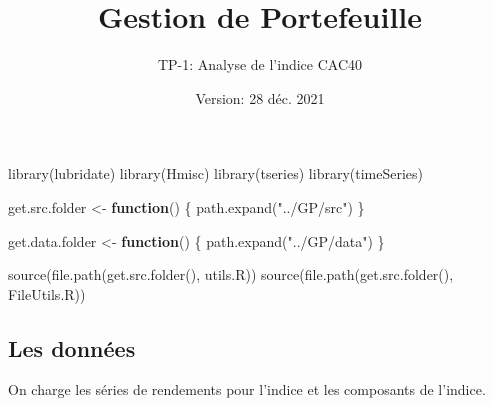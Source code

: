 \documentclass[
]{article}
\title{Gestion de Portefeuille}
\subtitle{TP-1: Analyse de l'indice CAC40}
\author{}
\date{\vspace{-2.5em}Version: 28 déc. 2021}
\newenvironment{Shaded}{\begin{snugshade}}{\end{snugshade}}
\newcommand{\ControlFlowTok}[1]{\textcolor[rgb]{0.13,0.29,0.53}{\textbf{#1}}}
\newcommand{\FunctionTok}[1]{\textcolor[rgb]{0.00,0.00,0.00}{#1}}
\newcommand{\NormalTok}[1]{#1}
\newcommand{\OtherTok}[1]{\textcolor[rgb]{0.56,0.35,0.01}{#1}}
\newcommand{\StringTok}[1]{\textcolor[rgb]{0.31,0.60,0.02}{#1}}
\begin{document}
\maketitle

\begin{Shaded}
\begin{Highlighting}[]
\FunctionTok{library}\NormalTok{(lubridate)}
\FunctionTok{library}\NormalTok{(Hmisc)}
\FunctionTok{library}\NormalTok{(tseries)}
\FunctionTok{library}\NormalTok{(timeSeries)}

\NormalTok{get.src.folder }\OtherTok{\textless{}{-}} \ControlFlowTok{function}\NormalTok{() \{}
  \FunctionTok{path.expand}\NormalTok{(}\StringTok{"../GP/src"}\NormalTok{)}
\NormalTok{\}}

\NormalTok{get.data.folder }\OtherTok{\textless{}{-}} \ControlFlowTok{function}\NormalTok{() \{}
  \FunctionTok{path.expand}\NormalTok{(}\StringTok{"../GP/data"}\NormalTok{)}
\NormalTok{\}}

\FunctionTok{source}\NormalTok{(}\FunctionTok{file.path}\NormalTok{(}\FunctionTok{get.src.folder}\NormalTok{(), }\StringTok{\textquotesingle{}utils.R\textquotesingle{}}\NormalTok{))}
\FunctionTok{source}\NormalTok{(}\FunctionTok{file.path}\NormalTok{(}\FunctionTok{get.src.folder}\NormalTok{(), }\StringTok{\textquotesingle{}FileUtils.R\textquotesingle{}}\NormalTok{))}
\end{Highlighting}
\end{Shaded}

\hypertarget{les-donnuxe9es}{%
\subsection{Les données}\label{les-donnuxe9es}}

On charge les séries de rendements pour l'indice et les composants de
l'indice.
\end{document}
